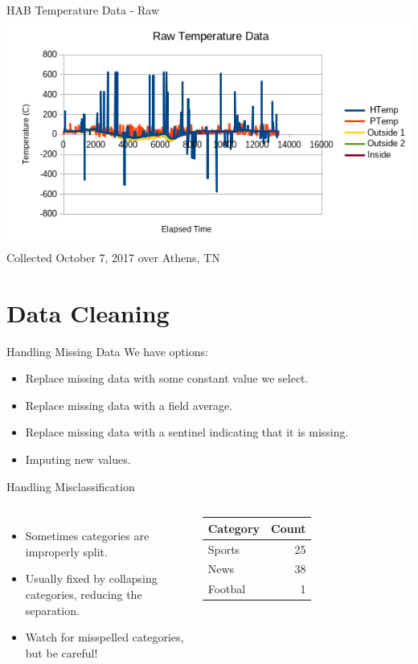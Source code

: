\documentclass[handout]{beamer}
\begin{document}
\begin{frame}{HAB Temperature Data - Raw}
\includegraphics[width=\textwidth]{images/rawtemp}
{\tiny Collected October 7, 2017 over Athens, TN}
\end{frame}

\section{Data Cleaning}
\begin{frame}{Handling Missing Data}
We have options:
\begin{itemize}[<+->]
  \item Replace missing data with some constant value we select.
  \item Replace missing data with a field average.
  \item Replace missing data with a sentinel indicating that it is missing.
  \item Imputing new values.
\end{itemize}
\end{frame}

\begin{frame}{Handling Misclassification}
\begin{columns}
  \begin{itemize}[<+->]
  \item Sometimes categories are improperly split.
  \item Usually fixed by collapsing categories, reducing the separation.
  \item Watch for misspelled categories, but be careful!
  \end{itemize}
  
  \begin{tabular}{l|r}
  {\bf Category} & {\bf Count} \\
  \hline
  Sports & 25 \\
  News & 38 \\
  Footbal & 1\\
  \end{tabular}
\end{columns}
\end{frame}
\end{document}
